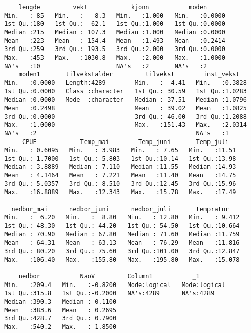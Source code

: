 \documentclass[
]{article}
\begin{document}
\begin{verbatim}
     lengde         vekt            kjonn           moden       
 Min.   : 85   Min.   :   8.3   Min.   :1.000   Min.   :0.0000  
 1st Qu.:180   1st Qu.:  62.1   1st Qu.:1.000   1st Qu.:0.0000  
 Median :215   Median : 107.3   Median :1.000   Median :0.0000  
 Mean   :223   Mean   : 154.4   Mean   :1.493   Mean   :0.2414  
 3rd Qu.:259   3rd Qu.: 193.5   3rd Qu.:2.000   3rd Qu.:0.0000  
 Max.   :453   Max.   :1030.8   Max.   :2.000   Max.   :1.0000  
 NA's   :10                     NA's   :2       NA's   :2       
     moden1       tilvekstalder         tilvekst        inst_vekst    
 Min.   :0.0000   Length:4289        Min.   :  4.41   Min.   :0.3828  
 1st Qu.:0.0000   Class :character   1st Qu.: 30.59   1st Qu.:1.0283  
 Median :0.0000   Mode  :character   Median : 37.51   Median :1.0796  
 Mean   :0.2498                      Mean   : 39.02   Mean   :1.0825  
 3rd Qu.:0.0000                      3rd Qu.: 46.00   3rd Qu.:1.2088  
 Max.   :1.0000                      Max.   :151.43   Max.   :2.0314  
 NA's   :2                                            NA's   :1       
      CPUE            Temp_mai        Temp_juni       Temp_juli    
 Min.   : 0.6095   Min.   : 3.983   Min.   : 7.65   Min.   :11.51  
 1st Qu.: 1.7000   1st Qu.: 5.803   1st Qu.:10.14   1st Qu.:13.98  
 Median : 3.8889   Median : 7.110   Median :11.55   Median :14.93  
 Mean   : 4.1464   Mean   : 7.221   Mean   :11.40   Mean   :14.75  
 3rd Qu.: 5.0357   3rd Qu.: 8.510   3rd Qu.:12.45   3rd Qu.:15.96  
 Max.   :16.8889   Max.   :12.343   Max.   :15.78   Max.   :17.49  
                                                                   
   nedbor_mai      nedbor_juni      nedbor_juli       tempratur     
 Min.   :  6.20   Min.   :  8.80   Min.   : 12.80   Min.   : 9.412  
 1st Qu.: 48.30   1st Qu.: 44.20   1st Qu.: 54.50   1st Qu.:10.664  
 Median : 70.90   Median : 67.80   Median : 71.60   Median :11.759  
 Mean   : 64.31   Mean   : 63.13   Mean   : 76.29   Mean   :11.816  
 3rd Qu.: 80.20   3rd Qu.: 75.60   3rd Qu.:101.00   3rd Qu.:12.847  
 Max.   :106.40   Max.   :155.80   Max.   :195.80   Max.   :15.078  
                                                                    
     nedbor           NaoV         Column1           _1         
 Min.   :209.4   Min.   :-0.8200   Mode:logical   Mode:logical  
 1st Qu.:315.8   1st Qu.:-0.2000   NA's:4289      NA's:4289     
 Median :390.3   Median :-0.1100                                
 Mean   :383.6   Mean   : 0.2695                                
 3rd Qu.:428.7   3rd Qu.: 0.7900                                
 Max.   :540.2   Max.   : 1.8500                                
                                                                

\end{verbatim}
\end{document}
